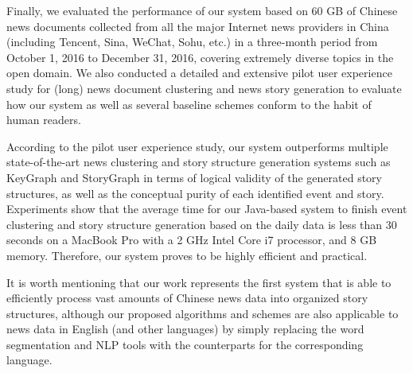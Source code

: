 Finally, we evaluated the performance of our system based on 60 GB of Chinese news documents collected from all the major Internet news providers in China (including Tencent, Sina, WeChat, Sohu, etc.) in a three-month period from October 1, 2016 to December 31, 2016, covering extremely diverse topics in the open domain. 
We also conducted a detailed and extensive pilot user experience study for (long) news document clustering and news story generation to evaluate how our system as well as several baseline schemes conform to the habit of human readers.

According to the pilot user experience study, our system outperforms multiple state-of-the-art news clustering and story structure generation systems such as KeyGraph \cite{sayyadi2013graph} and StoryGraph \cite{yang2009discovering} in terms of logical validity of the generated story structures, as well as the conceptual purity of each identified event and story. Experiments show that the average time for our Java-based system to finish event clustering and story structure generation based on the daily data is less than $30$ seconds on  a MacBook Pro with a 2 GHz Intel Core i7 processor, and 8 GB memory. Therefore, our system proves to be highly efficient and practical.


It is worth mentioning that our work represents the first system that is able to efficiently process vast amounts of Chinese news data into organized story structures, although our proposed algorithms and schemes are also applicable to news data in English (and other languages) by simply replacing the word segmentation and NLP tools with the counterparts for the corresponding language.    

 






